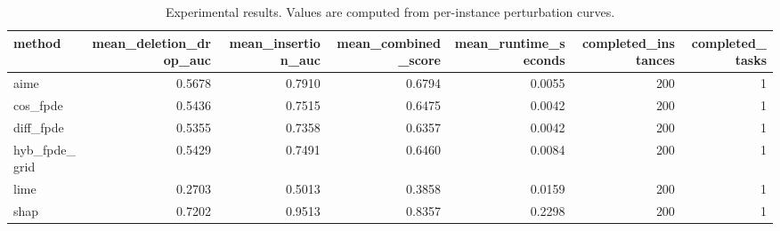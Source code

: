 \begin{table}[t]
\caption{Experimental results. Values are computed from per-instance perturbation curves.}
\label{tab:main_results_computed}
\centering
\begin{tabular}{lrrrrrr}
\toprule
method & mean\_deletion\_drop\_auc & mean\_insertion\_auc & mean\_combined\_score & mean\_runtime\_seconds & completed\_instances & completed\_tasks \\
\midrule
aime & 0.5678 & 0.7910 & 0.6794 & 0.0055 & 200 & 1 \\
cos\_fpde & 0.5436 & 0.7515 & 0.6475 & 0.0042 & 200 & 1 \\
diff\_fpde & 0.5355 & 0.7358 & 0.6357 & 0.0042 & 200 & 1 \\
hyb\_fpde\_grid & 0.5429 & 0.7491 & 0.6460 & 0.0084 & 200 & 1 \\
lime & 0.2703 & 0.5013 & 0.3858 & 0.0159 & 200 & 1 \\
shap & 0.7202 & 0.9513 & 0.8357 & 0.2298 & 200 & 1 \\
\bottomrule
\end{tabular}

\end{table}

